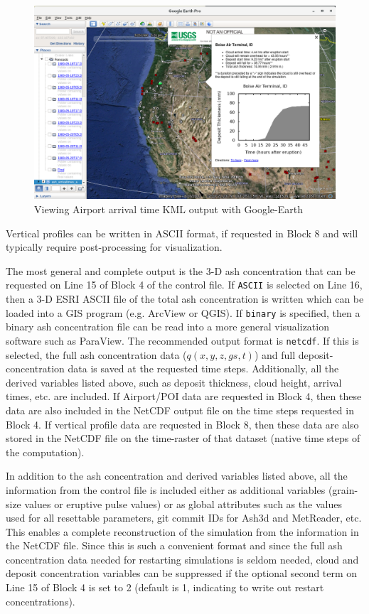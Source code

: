 \begin{figure}[htbp]
\includegraphics[angle=0,scale=0.35]{Figures/Ash3dOutput_KMLPOIarrival_GoogleEarth.png}
\parbox{15cm}{\caption{\label{FigAsh3dOutputKMLPOIarrivalTS}
Viewing Airport arrival time KML output with Google-Earth}}
\end{figure}

Vertical profiles can be written in ASCII format, if requested in Block 8 and will typically
require post-processing for visualization.

The most general and complete output is the 3-D ash concentration that can be requested on
Line 15 of Block 4 of the control file. If \texttt{ASCII} is selected on Line 16, then
a 3-D ESRI ASCII file of the total ash concentration is written which can be loaded into
a GIS program (e.g. ArcView or QGIS). If \texttt{binary} is specified, then a binary
ash concentration file can be read into a more general visualization software such
as ParaView. The recommended output format is \texttt{netcdf}. If this is selected,
the full ash concentration data ($q(x,y,z,gs,t)$) and full deposit-concentration data is saved at
the requested time steps. Additionally, all the derived variables listed above, such
as deposit thickness, cloud height, arrival times, etc. are included. If Airport/POI
data are requested in Block 4, then these data are also included in the NetCDF output
file on the time steps requested in Block 4.  If vertical profile data are requested in
Block 8, then these data are also stored in the NetCDF file on the time-raster of that
dataset (native time steps of the computation).

In addition to the ash concentration and derived variables listed above, all the
information from the control file is included either as additional variables (grain-size
values or eruptive pulse values) or as global attributes such as the values used for
all resettable parameters, git commit IDs for Ash3d and MetReader, etc.  This enables
a complete reconstruction of the simulation from the information in the NetCDF file.
Since this is such a convenient format and since the full ash concentration data needed
for restarting simulations is seldom needed, cloud and deposit concentration variables
can be suppressed if the optional second term on Line 15 of Block 4 is set to 2 (default
is 1, indicating to write out restart concentrations).


